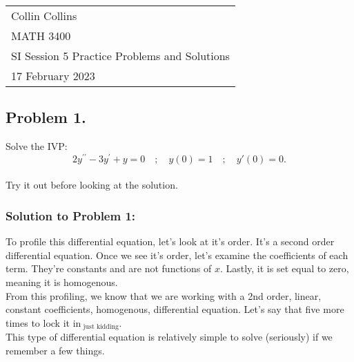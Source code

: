 \documentclass[a4paper,12pt]{article} %
\begin{document}



\thispagestyle{empty} %

\begin{tabular}{p{15.5cm}} %
\\ Collin Collins \\
MATH 3400\\
SI Session 5 Practice Problems and Solutions\\
17 February 2023 \\
\hline %

\end{tabular} 

\subsection*{Problem 1.} 
Solve the IVP:
$$2 y^{\prime \prime}-3 y^{\prime}+y=0 \quad ; \quad y(0)=1 \quad ; \quad y'(0)=0.$$
\\
 
Try it out before looking at the solution.
\pagebreak

\subsubsection*{Solution to Problem 1:}
To profile this differential equation, let's look at it's order. It's a second order differential equation. Once we see it's order, let's examine the coefficients of each term. They're constants and are not functions of $x$. Lastly, it is set equal to zero, meaning it is homogenous.\\

From this profiling, we know that we are working with a 2nd order, linear, constant coefficients, homogenous, differential equation. Let's say that five more times to lock it in$_{\text{ just kidding}}$.\\

This type of differential equation is relatively simple to solve (seriously) if we remember a few things.
\end{document}
